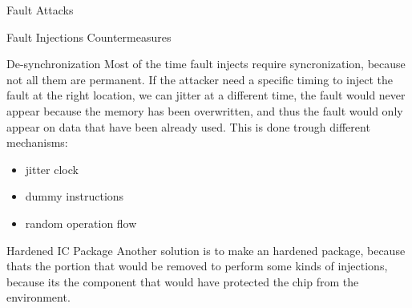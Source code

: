 \begin{chapter}{Fault Attacks}
\begin{section}{Fault Injections Countermeasures}
    \begin{subsection}{De-synchronization}
      Most of the time fault injects require syncronization, because not all them are permanent. If
      the attacker need a specific timing to inject the fault at the right location, we can jitter
      at a different time, the fault would never appear because the memory has been overwritten, and
      thus the fault would only appear on data that have been already used.
      This is done trough different mechanisms:
      \begin{itemize}
        \item jitter clock
        \item dummy instructions
        \item random operation flow
      \end{itemize}

    \end{subsection}
    \begin{subsection}{Hardened IC Package}
      Another solution is to make an hardened package, because thats the portion that would be
      removed to perform some kinds of injections, because its the component that would have
      protected the chip from the environment.\\

    \end{subsection}
  \end{section}

\end{chapter}
